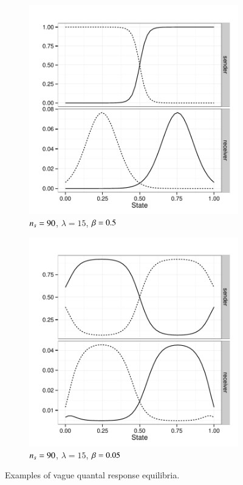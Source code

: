 \begin{figure}
  \centering
  
  \begin{subfigure}[]{0.45\textwidth}
    \includegraphics[width=\textwidth]{plots/exampleStratQRE_tolerance05.pdf}
    \caption{$n_s = 90$, $\lambda = 15$, $\beta = 0.5$}
    \label{fig:exampleQRE_stratsA}
  \end{subfigure}
  \hfill
  \begin{subfigure}[]{0.45\textwidth}
    \includegraphics[width=\textwidth]{plots/exampleStratQRE_tolerance005.pdf}
    \caption{$n_s = 90$, $\lambda = 15$, $\beta = 0.05$}
    \label{fig:exampleQRE_stratsB}
  \end{subfigure}

  \caption{Examples of vague quantal response equilibria.}
  \label{fig:exampleQREs}
\end{figure}


